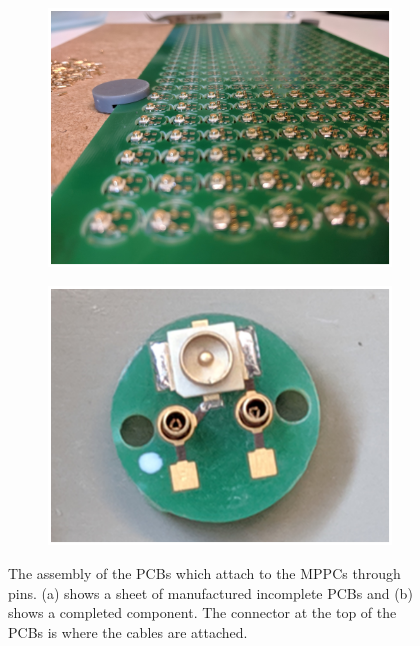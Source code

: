 \begin{figure}[!h]
\centering
\begin{subfigure}{.5\textwidth}
  \centering
  \includegraphics[width=\linewidth]{Chapter3/Figs/Raster/detCon008b_PlacingPcbs.png}
  \captionsetup{width=.9\linewidth}
  \caption{}
  \label{subFig:detCon008b_PlacingPcbs}
\end{subfigure}%
\begin{subfigure}{.5\textwidth}
  \centering
  \includegraphics[width=\linewidth]{Chapter3/Figs/Raster/detCon009b_SoloPcb.png}
  \captionsetup{width=.9\linewidth}
  \caption{}
  \label{subFig:detCon009b_SoloPcb}
\end{subfigure}
\caption{The assembly of the PCBs which attach to the MPPCs through pins. (a) shows a sheet of manufactured incomplete PCBs and (b) shows a completed component. The connector at the top of the PCBs is where the cables are attached. }
\label{fig:detCon_PlacingPcbs_SoloPcb}
\end{figure}

